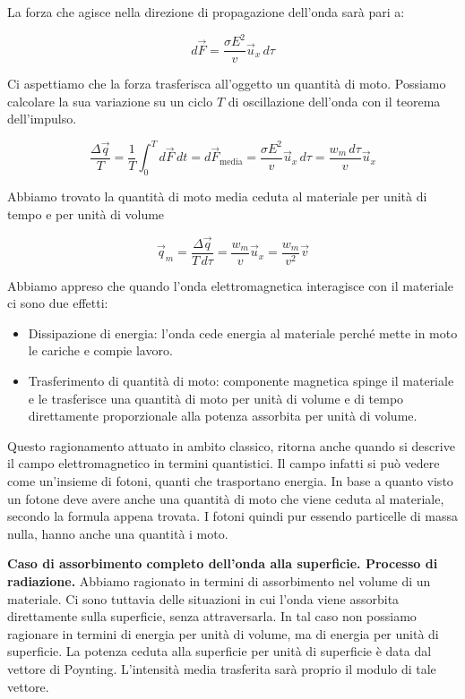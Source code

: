La forza che agisce nella direzione di propagazione dell'onda sarà pari a:

\[
	d\vec{F} = \frac{\sigma E^2}{v}\vec{u}_x \, d\tau
\]

Ci aspettiamo che la forza trasferisca all'oggetto un quantità di moto. Possiamo calcolare la sua variazione su un ciclo $T$ di oscillazione dell'onda con il teorema dell'impulso.

\[
	\frac{\Delta \vec{q}}{T} = \frac{1}{T} \int_0^T d\vec{F} \,dt = d\vec{F}_{\text{media}} =  \frac{\sigma E^2}{v}\vec{u}_x \, d\tau = \frac{w_m\,d\tau}{v}\vec{u}_x
\]

Abbiamo trovato la quantità di moto media ceduta al materiale per unità di tempo e per unità di volume

\[
	\vec{q}_m = \frac{\Delta \vec{q}}{T\,d\tau} = \frac{w_m}{v}\vec{u}_x = \frac{w_m}{v^2}\vec{v}
\]

Abbiamo appreso che quando l'onda elettromagnetica interagisce con il materiale ci sono due effetti:

\begin{itemize}
	\item Dissipazione di energia: l'onda cede energia al materiale perché mette in moto le cariche e compie lavoro.
	\item Trasferimento di quantità di moto: componente magnetica spinge il materiale e le trasferisce una quantità di moto per unità di volume e di tempo direttamente proporzionale alla potenza assorbita per unità di volume.
\end{itemize}

Questo ragionamento attuato in ambito classico, ritorna anche quando si descrive il campo elettromagnetico in termini quantistici. Il campo infatti si può vedere come un'insieme di fotoni, quanti che trasportano energia. In base a quanto visto un fotone deve avere anche una quantità di moto che viene ceduta al materiale, secondo la formula appena trovata. I fotoni quindi pur essendo particelle di massa nulla, hanno anche una quantità i moto.

\textbf{Caso di assorbimento completo dell'onda alla superficie. Processo di radiazione.} Abbiamo ragionato in termini di assorbimento nel volume di un materiale. Ci sono tuttavia delle situazioni in cui l'onda viene assorbita direttamente sulla superficie, senza attraversarla. In tal caso non possiamo ragionare in termini di energia per unità di volume, ma di energia per unità di superficie.
La potenza ceduta alla superficie per unità di superficie è data dal vettore di Poynting. L'intensità media trasferita sarà proprio il modulo di tale vettore.

